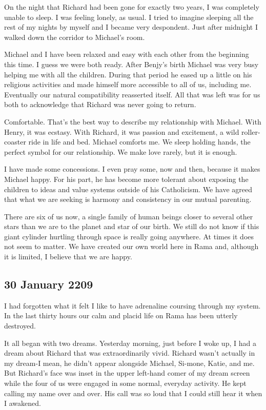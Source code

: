 \documentclass[]{article}
\begin{document}
On the night that Richard had been gone for exactly two years, I was completely unable to sleep.  I was feeling lonely, as usual.  I tried to imagine sleeping all the rest of my nights by myself and I became very despondent.  Just after midnight I walked down the corridor to Michael’s room.

Michael and I have been relaxed and easy with each other from the beginning this time.  I guess we were both ready.  After Benjy’s birth Michael was very busy helping me with all the children.  During that period he eased up a little on his religious activities and made himself more accessible to all of us, including me.  Eventually our natural compatibility reasserted itself.  All that was left was for us both to acknowledge that Richard was never going to return.

Comfortable.  That’s the best way to describe my relationship with Michael.  With Henry, it was ecstasy.  With Richard, it was passion and excitement, a wild roller-coaster ride in life and bed.  Michael comforts me.  We sleep holding hands, the perfect symbol for our relationship.  We make love rarely, but it is enough.

I have made some concessions.  I even pray some, now and then, because it makes Michael happy.  For his part, he has become more tolerant about exposing the children to ideas and value systems outside of his Catholicism.  We have agreed that what we are seeking is harmony and consistency in our mutual parenting.

There are six of us now, a single family of human beings closer to several other stars than we are to the planet and star of our birth.  We still do not know if this giant cylinder hurtling through space is really going anywhere.  At times it does not seem to matter.  We have created our own world here in Rama and, although it is limited, I believe that we are happy.

\subsection*{30 January 2209}

I had forgotten what it felt I like to have adrenaline coursing through my system.  In the last thirty hours our calm and placid life on Rama has been utterly destroyed.

It all began with two dreams.  Yesterday morning, just before I woke up, I had a dream about Richard that was extraordinarily vivid.  Richard wasn’t actually in my dream-I mean, he didn’t appear alongside Michael, Si-mone, Katie, and me.  But Richard’s face was inset in the upper left-hand comer of my dream screen while the four of us were engaged in some normal, everyday activity.  He kept calling my name over and over.  His call was so loud that I could still hear it when I awakened.
\end{document}
